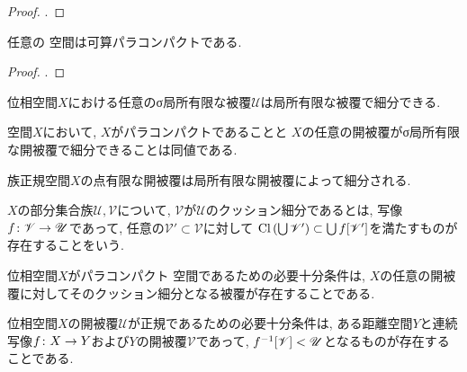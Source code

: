 \documentclass[uplatex, dvipdfmx, a4paper, 12pt, class=jsbook, crop=false]{standalone}
\begin{document}
\begin{proof}
	\WIP.
\end{proof}

\begin{proposition}
	任意の  空間は可算パラコンパクトである.
\end{proposition}
\begin{proof}
	\WIP.
\end{proof}

\begin{proposition}
	位相空間$ X $における任意のσ局所有限な被覆$ \mathscr{U} $は局所有限な被覆で細分できる.
\end{proposition}

\begin{proposition}
	 空間$ X $において, $ X $がパラコンパクトであることと
	$ X $の任意の開被覆がσ局所有限な開被覆で細分できることは同値である.
\end{proposition}

\begin{proposition}
	族正規空間$ X $の点有限な開被覆は局所有限な開被覆によって細分される.
\end{proposition}

\begin{definition}
	$ X $の部分集合族$ \mathscr{U}, \mathscr{V} $について, $ \mathscr{V} $が$ \mathscr{U} $のクッション細分であるとは,
	写像$ f\colon\mathscr{V}\to\mathscr{U} $であって, 任意の$ \mathscr{V}' \subset \mathscr{V} $に対して
	$ \mathop{\mathrm{Cl}}\nolimits \left(\bigcup \mathscr{V}' \right) \subset \bigcup f[\mathscr{V}'] $を満たすものが存在することをいう.
\end{definition}

\begin{theorem}
	位相空間$ X $がパラコンパクト  空間であるための必要十分条件は,
	$ X $の任意の開被覆に対してそのクッション細分となる被覆が存在することである.
\end{theorem}

\begin{proposition}
	位相空間$ X $の開被覆$ \mathscr{U} $が正規であるための必要十分条件は,
	ある距離空間$ Y $と連続写像$ f\colon X\to Y $および$ Y $の開被覆$ \mathscr{V} $であって,
	$ \mapinvset{f}{\mathscr{V}} < \mathscr{U} $となるものが存在することである.
\end{proposition}
\end{document}
